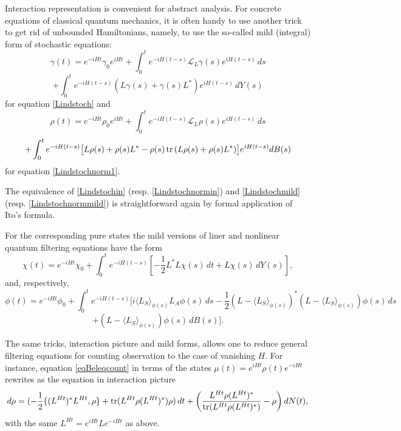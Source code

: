 \documentclass[12pt]{article}
\def\LC{\mathcal{L}}
\def\tr{\rm{tr}}
\def\ga{\gamma}
\begin{document}
Interaction representation is convenient for abstract analysis. For concrete equations
of classical quantum mechanics, it is often handy to use another trick to get rid of unbounded
Hamiltonians, namely, to use the so-called mild (integral) form of stochastic equations:
\[
\ga(t)=e^{-iHt}\ga_0e^{iHt}
+\int_0^t e^{-iH(t-s)} \LC_L\ga (s)  e^{iH(t-s)} \, ds
\]
\begin{equation}
\label{Lindstochmild}
 +\int_0^t e^{-iH(t-s)} (L\ga(s)+\ga(s) L^*) e^{iH(t-s)}\, dY(s)
\end{equation}
for equation \eqref{Lindstoch} and
\[
\rho(t)=e^{-iHt}\rho_0 e^{iHt}
+\int_0^t e^{-iH(t-s)} \LC_L\rho (s)  e^{iH(t-s)} \, ds
\]
\begin{equation}
\label{Lindstochnormmild}
+\int_0^t e^{-iH(t-s)} \bigl[
L\rho(s)+\rho(s) L^*-\rho(s)\, {\tr} \, (L\rho(s)+\rho(s) L^*) \bigr] e^{iH(t-s)} dB(s)
\end{equation}
for equation \eqref{Lindstochnorm1}.

The equivalence of \eqref{Lindstochin} (resp. \eqref{Lindstochnormin}) and \eqref{Lindstochmild}
(resp. \eqref{Lindstochnormmild}) is straightforward again by formal application of Ito's formula.

For the corresponding pure states the mild versions
 of liner and nonlinear quantum filtering equations have the form
\begin{equation}
\label{eqqufiBlinsm}
\chi(t) =e^{-iH t}\chi_0+\int_0^t e^{-iH(t-s)} [-\frac12 L^*L \chi(s) \,dt+L \chi(s) \, dY(s)],
\end{equation}
and, respectively,
\[
\phi(t)=e^{-iH t}\phi_0+\int_0^t e^{-iH (t-s)} \bigl[ i\langle L_S \rangle_{\phi(s)} L_A \phi(s) \, ds
-\frac12 (L-\langle L_S \rangle_{\phi(s)})^*(L-\langle L_S \rangle_{\phi(s)})\phi(s) \, ds
\]
\begin{equation}
\label{eqqufiBnonlinsm}
+ (L-\langle L_S \rangle_{\phi(s)})\phi(s) \, dB(s)\bigr].
\end{equation}

The same tricks, interaction picture and mild forms,
allows one to reduce general filtering equations for counting observation
to the case of vanishing $H$. For instance, equation \eqref{eqBeleqcount} in terms of the states
$\mu(t)=e^{iHt}\rho(t) e^{-iHt}$ rewrites as the equation in interaction picture
 \begin{equation}
\label{eqBeleqcountin}
d\rho=(-\frac12 \{(L^{Ht})^*L^{Ht},\rho\}+ {\tr} (L^{Ht}\rho (L^{Ht})^*) \rho ) \, dt
+\left(\frac{L^{Ht}\rho (L^{Ht})^*}{{\tr} (L^{Ht}\rho (L^{Ht})^*)}-\rho\right) dN(t),
\end{equation}
with the same $L^{Ht}=e^{iHt} L e^{-iHt}$ as above.
\end{document}
